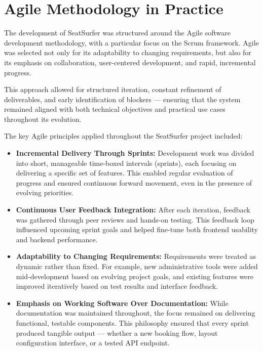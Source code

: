 \documentclass[12pt,a4paper]{report}
\begin{document}
\section{Agile Methodology in Practice}

The development of SeatSurfer was structured around the Agile software development methodology, with a particular focus on the Scrum framework. Agile was selected not only for its adaptability to changing requirements, but also for its emphasis on collaboration, user-centered development, and rapid, incremental progress.

This approach allowed for structured iteration, constant refinement of deliverables, and early identification of blockers — ensuring that the system remained aligned with both technical objectives and practical use cases throughout its evolution.

The key Agile principles applied throughout the SeatSurfer project included:

\begin{itemize}
\item \textbf{Incremental Delivery Through Sprints:}
Development work was divided into short, manageable time-boxed intervals (sprints), each focusing on delivering a specific set of features. This enabled regular evaluation of progress and ensured continuous forward movement, even in the presence of evolving priorities.
\item \textbf{Continuous User Feedback Integration:}  
After each iteration, feedback was gathered through peer reviews and hands-on testing. This feedback loop influenced upcoming sprint goals and helped fine-tune both frontend usability and backend performance.

\item \textbf{Adaptability to Changing Requirements:}  
Requirements were treated as dynamic rather than fixed. For example, new administrative tools were added mid-development based on evolving project goals, and existing features were improved iteratively based on test results and interface feedback.

\item \textbf{Emphasis on Working Software Over Documentation:}  
While documentation was maintained throughout, the focus remained on delivering functional, testable components. This philosophy ensured that every sprint produced tangible output — whether a new booking flow, layout configuration interface, or a tested API endpoint.
\end{itemize}
\end{document}
